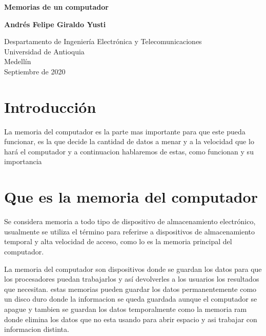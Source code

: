 \documentclass{article}
\begin{document}
\begin{titlepage}
    \begin{center}
        \vspace*{1cm}
            
        \Huge
        \textbf{Memorias de un computador}
            
        \vspace{0.5cm}
            
        \vspace{1.5cm}
            
        \textbf{Andrés Felipe Giraldo Yusti}
            
        \vfill
            
        \vspace{0.8cm}
            
        \Large
        Despartamento de Ingeniería Electrónica y Telecomunicaciones\\
        Universidad de Antioquia\\
        Medellín\\
        Septiembre de 2020
            
    \end{center}
\end{titlepage}

\tableofcontents

\section{Introducción}
La memoria del computador es la parte mas importante para que este pueda funcionar, es la que decide la cantidad de datos a menar y a la velocidad que lo hará el computador y a continuacion hablaremos de estas, como funcionan y su importancia

\section{Que es la memoria del computador} \label{Que es la memoria del computador}


Se considera memoria a todo tipo de dispositivo de almacenamiento electrónico, usualmente se utiliza el término para referirse a dispositivos de almacenamiento temporal y alta velocidad de acceso, como lo es la memoria principal del computador.\cite{knuth-fa}

\vspace{0.5cm}

La memoria del computador son dispositivos donde se guardan los datos para que los procesadores puedan trabajarlos y así devolverles a los usuarios los resultados que necesitan. estas memorias pueden guardar los datos permanentemente como un disco duro donde la informacion se queda guardada aunque el computador se apague y tambien se guardan los datos temporalmente como la memoria ram donde elimina los datos que no esta usando para abrir espacio y asi trabajar con informacion distinta.
\clearpage
\end{document}
